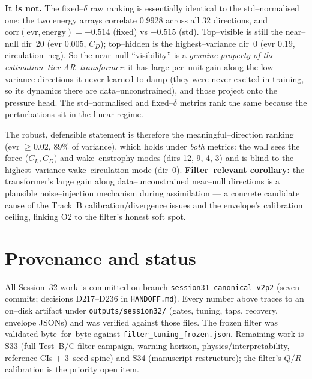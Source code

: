 \documentclass[11pt]{article}
\begin{document}
\textbf{It is not.} The fixed--$\delta$ raw ranking is essentially identical to the
std--normalised one: the two energy arrays correlate $0.9928$ across all 32 directions, and
$\mathrm{corr}(\text{evr},\text{energy}) = -0.514$ (fixed) vs $-0.515$ (std). Top--visible is
still the near--null dir~20 (evr $0.005$, $C_D$); top--hidden is the highest--variance dir~0
(evr $0.19$, circulation--neg). So the near--null ``visibility'' is a \emph{genuine property of
the estimation--tier AR--transformer}: it has large per--unit gain along the low--variance
directions it never learned to damp (they were never excited in training, so its dynamics there
are data--unconstrained), and those project onto the pressure head. The std--normalised and
fixed--$\delta$ metrics rank the same because the perturbations sit in the linear regime.

The robust, defensible statement is therefore the meaningful--direction ranking (evr $\ge 0.02$,
$89\%$ of variance), which holds under \emph{both} metrics: the wall sees the force ($C_L,C_D$)
and wake--enstrophy modes (dirs 12, 9, 4, 3) and is blind to the highest--variance
wake--circulation mode (dir~0). \textbf{Filter--relevant corollary:} the transformer's large gain
along data--unconstrained near--null directions is a plausible noise--injection mechanism during
assimilation --- a concrete candidate cause of the Track~B calibration/divergence issues and the
envelope's calibration ceiling, linking O2 to the filter's honest soft spot.

\section{Provenance and status}
All Session~32 work is committed on branch \texttt{session31-canonical-v2p2} (seven commits;
decisions D217--D236 in \texttt{HANDOFF.md}). Every number above traces to an on--disk artifact
under \texttt{outputs/session32/} (gates, tuning, taps, recovery, envelope JSONs) and was verified
against those files. The frozen filter was validated byte--for--byte against
\texttt{filter\_tuning\_frozen.json}. Remaining work is S33 (full Test~B/C filter campaign,
warning horizon, physics/interpretability, reference CIs $+$ 3--seed spine) and S34 (manuscript
restructure); the filter's $Q/R$ calibration is the priority open item.
\end{document}
